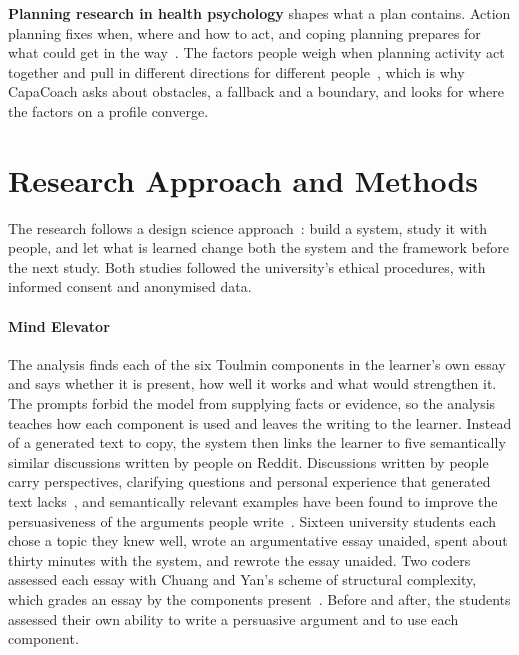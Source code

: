 \documentclass[manuscript,screen,review]{acmart}
\begin{document}
\textbf{Planning research in health psychology} shapes what a plan contains. Action planning fixes when, where and how to act, and coping planning prepares for what could get in the way~\cite{gollwitzer1999implementation,sniehotta2005bridging}. The factors people weigh when planning activity act together and pull in different directions for different people~\cite{paruthi2018finding}, which is why CapaCoach asks about obstacles, a fallback and a boundary, and looks for where the factors on a profile converge.

\section{Research Approach and Methods}

The research follows a design science approach~\cite{hevner2004design}: build a system, study it with people, and let what is learned change both the system and the framework before the next study. Both studies followed the university's ethical procedures, with informed consent and anonymised data.

\paragraph{Mind Elevator} The analysis finds each of the six Toulmin components in the learner's own essay and says whether it is present, how well it works and what would strengthen it. The prompts forbid the model from supplying facts or evidence, so the analysis teaches how each component is used and leaves the writing to the learner. Instead of a generated text to copy, the system then links the learner to five semantically similar discussions written by people on Reddit. Discussions written by people carry perspectives, clarifying questions and personal experience that generated text lacks~\cite{thukral2023generating,liu2024generative}, and semantically relevant examples have been found to improve the persuasiveness of the arguments people write~\cite{xia2022persua}. Sixteen university students each chose a topic they knew well, wrote an argumentative essay unaided, spent about thirty minutes with the system, and rewrote the essay unaided. Two coders assessed each essay with Chuang and Yan's scheme of structural complexity, which grades an essay by the components present~\cite{chuang2022investigation}. Before and after, the students assessed their own ability to write a persuasive argument and to use each component.
\end{document}
